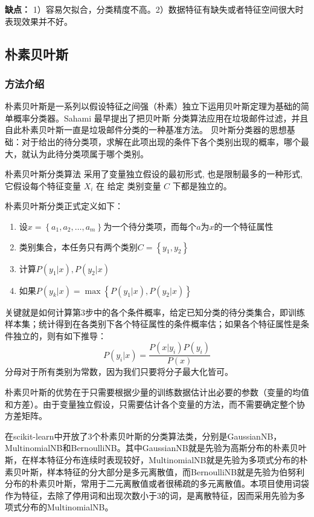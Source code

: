 \documentclass[a4paper]{article}
\begin{document}
\textbf{缺点：}
1）容易欠拟合，分类精度不高。2）数据特征有缺失或者特征空间很大时表现效果并不好。

\subsection{朴素贝叶斯}
\subsubsection{方法介绍}
朴素贝叶斯是一系列以假设特征之间强（朴素）独立下运用贝叶斯定理为基础的简单概率分类器。Sahami 最早提出了把贝叶斯 分类算法应用在垃圾邮件过滤\cite{sahami1998bayesian}，并且自此朴素贝叶斯一直是垃圾邮件分类的一种基准方法。
贝叶斯分类器的思想基础：对于给出的待分类项，求解在此项出现的条件下各个类别出现的概率，哪个最大，就认为此待分类项属于哪个类别。

朴素贝叶斯分类算法\cite{langley1992analysis} 采用了变量独立假设的最初形式, 也是限制最多的一种形式, 它假设每个特征变量 $X_i$ 在 给定 类别变量 $C$ 下都是独立的。

朴素贝叶斯分类正式定义\cite{张铭锋2005垃圾邮件过滤的贝叶斯方法综述}如下：
\begin{enumerate}
	\item 设$x = \left\{ a _ { 1 } , a _ { 2 } , \dots , a _ { m } \right\}$为一个待分类项，而每个$a$为$x$的一个特征属性
	\item 类别集合，本任务只有两个类别$C = \left\{ y _ { 1 } , y _ { 2 } \right\}$
	\item 计算$P \left( y _ { 1 } | x \right) , P \left( y _ { 2 } | x \right)$
	\item 如果$P \left( y _ { k } | x \right) = \max \left\{ P \left( y _ { 1 } | x \right) , P \left( y _ { 2 } | x \right)\right\}$
\end{enumerate}
关键就是如何计算第3步中的各个条件概率，给定已知分类的待分类集合，即训练样本集；统计得到在各类别下各个特征属性的条件概率估；如果各个特征属性是条件独立的，则有如下推导：
\begin{equation}
	P \left( y _ { i } | x \right) = \frac { P ( x | y _ { i } ) P \left( y _ { i } \right) } { P ( x ) }
\end{equation}
分母对于所有类别为常数，因为我们只要将分子最大化皆可。

朴素贝叶斯的优势在于只需要根据少量的训练数据估计出必要的参数（变量的均值和方差）。由于变量独立假设，只需要估计各个变量的方法，而不需要确定整个协方差矩阵。


在scikit-learn\cite{pedregosa2011scikit}中开放了3个朴素贝叶斯的分类算法类，分别是GaussianNB，MultinomialNB和BernoulliNB。其中GaussianNB就是先验为高斯分布的朴素贝叶斯，在样本特征分布连续时表现较好，MultinomialNB就是先验为多项式分布的朴素贝叶斯，样本特征的分大部分是多元离散值，而BernoulliNB就是先验为伯努利分布的朴素贝叶斯，常用于二元离散值或者很稀疏的多元离散值。本项目使用词袋作为特征，去除了停用词和出现次数小于3的词，是离散特征，因而采用先验为多项式分布的MultinomialNB。
\end{document}
